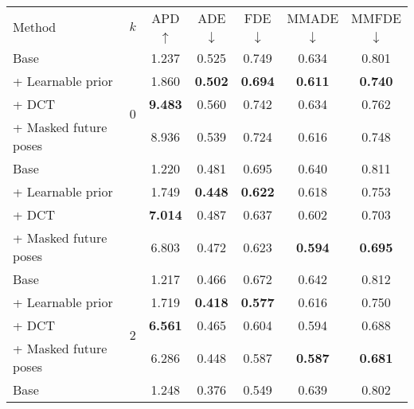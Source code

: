 \documentclass[main.tex]{subfiles}
\begin{document}
\begin{table}[htbp!]
    \centering
    \notsotiny
\begin{tabular}{lcccccc}
    \toprule
         \multirow{2}{*}{Method} & \multirow{2}{*}{$k$} & APD  & ADE  & FDE  & MMADE  & MMFDE  \\ 
         & & $\uparrow$ & $\downarrow$ & $\downarrow$& $\downarrow$& $\downarrow$\\
        \midrule
                  Base &  \multirow{5}{*}{0} &           1.237 &           0.525 &           0.749 &           0.634 &           0.801 \\
     + Learnable prior &   &           1.860 &  \textbf{0.502} &  \textbf{0.694} &  \textbf{0.611} &  \textbf{0.740} \\
                 + DCT &   &  \textbf{9.483} &           0.560 &           0.742 &           0.634 &           0.762 \\
 + Masked future poses &   &           8.936 &           0.539 &           0.724 &           0.616 &           0.748 \\
        \midrule
                  Base &  \multirow{5}{*}{1} &           1.220 &           0.481 &           0.695 &           0.640 &           0.811 \\
     + Learnable prior &   &           1.749 &  \textbf{0.448} &  \textbf{0.622} &           0.618 &           0.753 \\
                 + DCT &   &  \textbf{7.014} &           0.487 &           0.637 &           0.602 &           0.703 \\
 + Masked future poses &   &           6.803 &           0.472 &           0.623 &  \textbf{0.594} &  \textbf{0.695} \\
        \midrule
                  Base &  \multirow{5}{*}{2} &           1.217 &           0.466 &           0.672 &           0.642 &           0.812 \\
     + Learnable prior &   &           1.719 &  \textbf{0.418} &  \textbf{0.577} &           0.616 &           0.750 \\
                 + DCT &   &  \textbf{6.561} &           0.465 &           0.604 &           0.594 &           0.688 \\
 + Masked future poses &   &           6.286 &           0.448 &           0.587 &  \textbf{0.587} &  \textbf{0.681} \\
        \midrule
                  Base &  \multirow{5}{*}{3} &           1.248 &           0.376 &           0.549 &           0.639 &           0.802 \\

\end{tabular}
\end{table}
\end{document}
